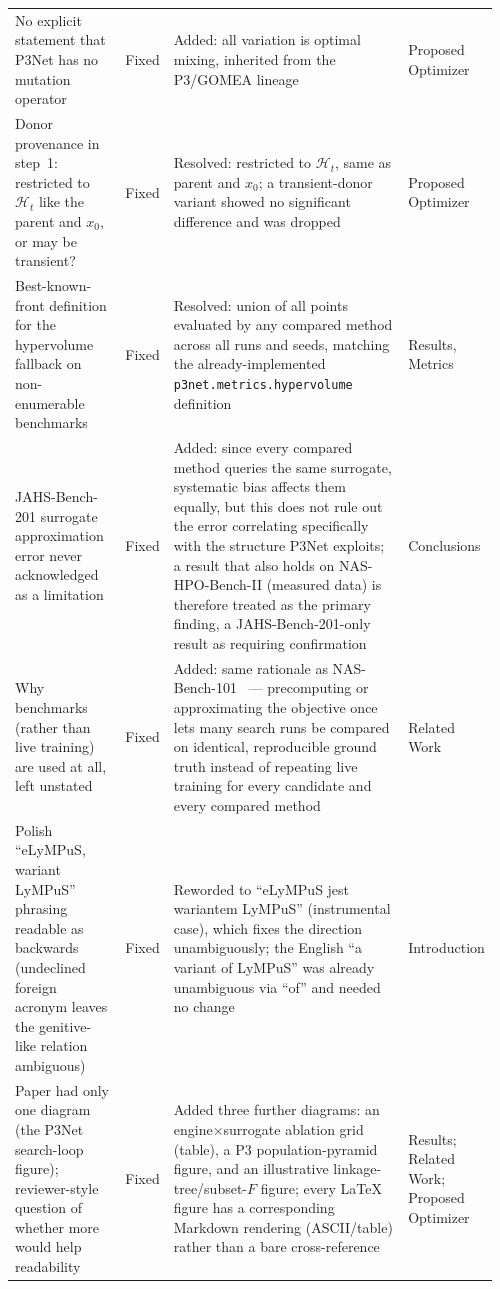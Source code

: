 \begin{longtable}{p{0.24\linewidth} p{0.08\linewidth} p{0.55\linewidth} p{0.09\linewidth}}
No explicit statement that P3Net has no mutation operator & Fixed & Added: all variation is optimal mixing, inherited from the P3/GOMEA lineage & Proposed Optimizer \\
Donor provenance in step~1: restricted to $\mathcal{H}_t$ like the parent and $x_0$, or may be transient? & Fixed & Resolved: restricted to $\mathcal{H}_t$, same as parent and $x_0$; a transient-donor variant showed no significant difference and was dropped & Proposed Optimizer \\
Best-known-front definition for the hypervolume fallback on non-enumerable benchmarks & Fixed & Resolved: union of all points evaluated by any compared method across all runs and seeds, matching the already-implemented \texttt{p3net.metrics.hypervolume} definition & Results, Metrics \\
JAHS-Bench-201 surrogate approximation error never acknowledged as a limitation & Fixed & Added: since every compared method queries the same surrogate, systematic bias affects them equally, but this does not rule out the error correlating specifically with the structure P3Net exploits; a result that also holds on NAS-HPO-Bench-II (measured data) is therefore treated as the primary finding, a JAHS-Bench-201-only result as requiring confirmation & Conclusions \\
Why benchmarks (rather than live training) are used at all, left unstated & Fixed & Added: same rationale as NAS-Bench-101~\citep{ying2019nasbench101} --- precomputing or approximating the objective once lets many search runs be compared on identical, reproducible ground truth instead of repeating live training for every candidate and every compared method & Related Work \\
Polish ``eLyMPuS, wariant LyMPuS'' phrasing readable as backwards (undeclined foreign acronym leaves the genitive-like relation ambiguous) & Fixed & Reworded to ``eLyMPuS jest wariantem LyMPuS'' (instrumental case), which fixes the direction unambiguously; the English ``a variant of LyMPuS'' was already unambiguous via ``of'' and needed no change & Introduction \\
Paper had only one diagram (the P3Net search-loop figure); reviewer-style question of whether more would help readability & Fixed & Added three further diagrams: an engine$\times$surrogate ablation grid (table), a P3 population-pyramid figure, and an illustrative linkage-tree/subset-$F$ figure; every LaTeX figure has a corresponding Markdown rendering (ASCII/table) rather than a bare cross-reference & Results; Related Work; Proposed Optimizer \\

\end{longtable}
